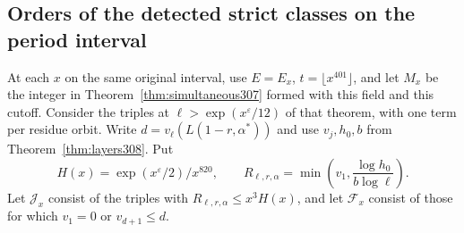 \documentclass[a4paper,11pt]{article}
\theoremstyle{definition}
\theoremstyle{remark}
\numberwithin{equation}{section}
\begin{document}
\subsection{Orders of the detected strict classes on the period interval}\label{nav:II-73}
At each \(x\) on the same original interval, use
\(E=E_x\), \(t=\lfloor x^{401}\rfloor\), and let \(M_x\)
be the integer in Theorem~\ref{thm:simultaneous307} formed
with this field and this cutoff. Consider the triples at
\(\ell>\exp(x^\varepsilon/12)\) of that theorem, with one
term per residue orbit. Write \(d=v_\ell(L(1-r,\alpha^*))\)
and use \(v_j,h_0,b\) from Theorem~\ref{thm:layers308}.
Put
\[
    H(x)=\exp(x^\varepsilon/2)/x^{820},\qquad
    R_{\ell,r,\alpha}=\min\left(v_1,\frac{\log h_0}{b\log\ell}\right).
\]
Let \(\mathcal J_x\) consist of the triples with
\(R_{\ell,r,\alpha}\le x^3H(x)\), and let
\(\mathcal F_x\) consist of those for which \(v_1=0\) or
\(v_{d+1}\le d\).
\end{document}
